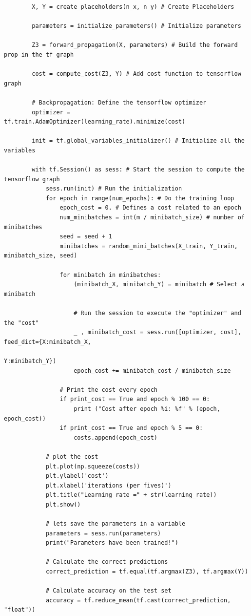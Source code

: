 \documentclass[11pt, a4paper]{article}
\begin{document}
\begin{spacing}{1.1}
	\begin{lstlisting}
		X, Y = create_placeholders(n_x, n_y) # Create Placeholders

		parameters = initialize_parameters() # Initialize parameters

		Z3 = forward_propagation(X, parameters) # Build the forward prop in the tf graph

		cost = compute_cost(Z3, Y) # Add cost function to tensorflow graph
		
		# Backpropagation: Define the tensorflow optimizer
		optimizer = tf.train.AdamOptimizer(learning_rate).minimize(cost)
		
		init = tf.global_variables_initializer() # Initialize all the variables
		
		with tf.Session() as sess: # Start the session to compute the tensorflow graph
			sess.run(init) # Run the initialization
			for epoch in range(num_epochs): # Do the training loop
				epoch_cost = 0. # Defines a cost related to an epoch
				num_minibatches = int(m / minibatch_size) # number of minibatches
				seed = seed + 1
				minibatches = random_mini_batches(X_train, Y_train, minibatch_size, seed)
				
				for minibatch in minibatches:
					(minibatch_X, minibatch_Y) = minibatch # Select a minibatch

					# Run the session to execute the "optimizer" and the "cost"
					_ , minibatch_cost = sess.run([optimizer, cost], feed_dict={X:minibatch_X, 
					                                                            Y:minibatch_Y})
					epoch_cost += minibatch_cost / minibatch_size
				
				# Print the cost every epoch
				if print_cost == True and epoch % 100 == 0:
					print ("Cost after epoch %i: %f" % (epoch, epoch_cost))
				if print_cost == True and epoch % 5 == 0:
					costs.append(epoch_cost)
		
			# plot the cost
			plt.plot(np.squeeze(costs))
			plt.ylabel('cost')
			plt.xlabel('iterations (per fives)')
			plt.title("Learning rate =" + str(learning_rate))
			plt.show()
			
			# lets save the parameters in a variable
			parameters = sess.run(parameters)
			print("Parameters have been trained!")
			
			# Calculate the correct predictions
			correct_prediction = tf.equal(tf.argmax(Z3), tf.argmax(Y))
			
			# Calculate accuracy on the test set
			accuracy = tf.reduce_mean(tf.cast(correct_prediction, "float"))
			

\end{lstlisting}
\end{spacing}
\end{document}
